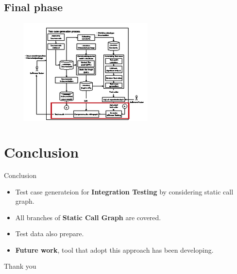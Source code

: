 \documentclass{beamer}
\begin{document}
\subsection{Final phase}
\begin{frame}
    \begin{figure}
        \includegraphics[height=0.8\paperheight]{figure/Methodology-Highlight-2}
    \end{figure}
\end{frame}

%
\section{Conclusion}
\begin{frame}{Conclusion}
    \begin{itemize}
        \item Test case generateion for \textbf{Integration Testing} by considering static call graph.
        \item All branches of \textbf{Static Call Graph} are covered.
        \item Test data also prepare.
        \item \textbf{Future work}, tool that adopt this approach has been developing.
    \end{itemize}
\end{frame}

%
\begin{frame}
    \Large{Thank you}
\end{frame}
\end{document}

